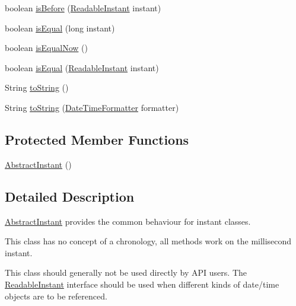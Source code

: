 \begin{DoxyCompactItemize}
\item 
boolean \hyperlink{classorg_1_1joda_1_1time_1_1base_1_1_abstract_instant_a3a99ebf882a1acefbe8afa6992ceb041}{is\-Before} (\hyperlink{interfaceorg_1_1joda_1_1time_1_1_readable_instant}{Readable\-Instant} instant)
\item 
boolean \hyperlink{classorg_1_1joda_1_1time_1_1base_1_1_abstract_instant_a05861be64b7a2c52019642974c78aeb3}{is\-Equal} (long instant)
\item 
boolean \hyperlink{classorg_1_1joda_1_1time_1_1base_1_1_abstract_instant_a8fc79d81143863d15110a3dd2cf370ec}{is\-Equal\-Now} ()
\item 
boolean \hyperlink{classorg_1_1joda_1_1time_1_1base_1_1_abstract_instant_ae0402245fade5f3930ed4c41dfd0be13}{is\-Equal} (\hyperlink{interfaceorg_1_1joda_1_1time_1_1_readable_instant}{Readable\-Instant} instant)
\item 
String \hyperlink{classorg_1_1joda_1_1time_1_1base_1_1_abstract_instant_a60362649a83168ced4967c446842da99}{to\-String} ()
\item 
String \hyperlink{classorg_1_1joda_1_1time_1_1base_1_1_abstract_instant_add5945dca8fdfbea9860e09781086401}{to\-String} (\hyperlink{classorg_1_1joda_1_1time_1_1format_1_1_date_time_formatter}{Date\-Time\-Formatter} formatter)
\end{DoxyCompactItemize}
\subsection*{Protected Member Functions}
\begin{DoxyCompactItemize}
\item 
\hyperlink{classorg_1_1joda_1_1time_1_1base_1_1_abstract_instant_ac11dd383f8edee2db24d9e2296b25449}{Abstract\-Instant} ()
\end{DoxyCompactItemize}


\subsection{Detailed Description}
\hyperlink{classorg_1_1joda_1_1time_1_1base_1_1_abstract_instant}{Abstract\-Instant} provides the common behaviour for instant classes. 

This class has no concept of a chronology, all methods work on the millisecond instant. 

This class should generally not be used directly by A\-P\-I users. The \hyperlink{interfaceorg_1_1joda_1_1time_1_1_readable_instant}{Readable\-Instant} interface should be used when different kinds of date/time objects are to be referenced. 

